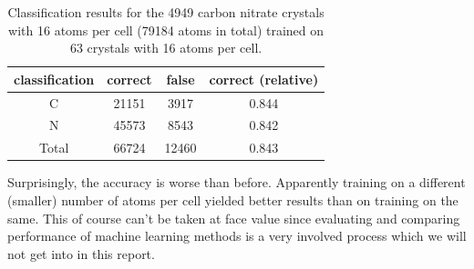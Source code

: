 \begin{table}[h!]
\center
\begin{tabular}{c|c|c|c}
classification & correct & false & correct (relative) \\ \hline
C              & 21151   & 3917  & 0.844              \\ \hline
N              & 45573   & 8543  & 0.842              \\ \hline
Total          & 66724   & 12460  & 0.843             
\end{tabular}
\caption{Classification results for the 4949 carbon nitrate crystals with 16 atoms per cell (79184 atoms in total) trained on 63 crystals with 16 atoms per cell.}
\label{table:res2}
\end{table}

Surprisingly, the accuracy is worse than before. Apparently training on a different (smaller) number of atoms per cell yielded better results than on training on the same. This of course can't be taken at face value since evaluating and comparing performance of machine learning methods is a very involved process which we will not get into in this report.

